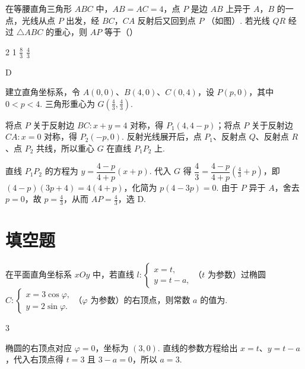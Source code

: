 \begin{problem}
在等腰直角三角形 \(ABC\) 中，\(AB = AC = 4\)，点 \(P\) 是边 \(AB\) 上异于 \(A\)，\(B\) 的一点，光线从点 \(P\) 出发，经 \(BC\)，\(CA\) 反射后又回到点 \(P\) （如图）. 若光线 \(QR\) 经过 \(\triangle ABC\) 的重心，则 \(AP\) 等于（\quad）

\choices
    {2}
    {1}
    {\( \frac{8}{3} \)}
    {\( \frac{4}{3} \)}
\end{problem}

\begin{answer}
D
\end{answer}

\begin{solution}
建立直角坐标系，令 \(A(0,0)\)、\(B(4,0)\)、\(C(0,4)\)，设 \(P(p,0)\)，其中 \(0<p<4\). 三角形重心为 \(G(\frac{4}{3},\frac{4}{3})\).

将点 \(P\) 关于反射边 \(BC:x+y=4\) 对称，得 \(P_{1}(4,4-p)\)；将点 \(P\) 关于反射边 \(CA:x=0\) 对称，得 \(P_{2}(-p,0)\). 反射光线展开后，点 \(P_{1}\)、反射点 \(Q\)、反射点 \(R\)、点 \(P_{2}\) 共线，所以重心 \(G\) 在直线 \(P_{1}P_{2}\) 上.

直线 \(P_{1}P_{2}\) 的方程为
\(y=\dfrac{4-p}{4+p}(x+p)\). 代入 \(G\) 得
\(\dfrac{4}{3}=\dfrac{4-p}{4+p}(\frac{4}{3}+p)\)，即
\((4-p)(3p+4)=4(4+p)\)，化简为 \(p(4-3p)=0\). 由于 \(P\) 异于 \(A\)，舍去 \(p=0\)，故 \(p=\frac{4}{3}\)，从而 \(AP=\frac{4}{3}\)，选 D.
\end{solution}

\section{填空题}

\begin{problem}
在平面直角坐标系 \(xOy\) 中，若直线 \(l: \begin{cases}
x = t,\\
y = t - a,
\end{cases}\)（\(t\) 为参数）过椭圆 \(C: \begin{cases}
x = 3\cos \varphi,\\
y = 2\sin \varphi.
\end{cases}\)（\(\varphi\) 为参数）的右顶点，则常数 \(a\) 的值为\fillinblank{}.
\end{problem}

\begin{answer}
3
\end{answer}

\begin{solution}
椭圆的右顶点对应 \(\varphi=0\)，坐标为 \((3,0)\). 直线的参数方程给出 \(x=t\)、\(y=t-a\)，代入右顶点得 \(t=3\) 且 \(3-a=0\)，所以 \(a=3\).
\end{solution}

